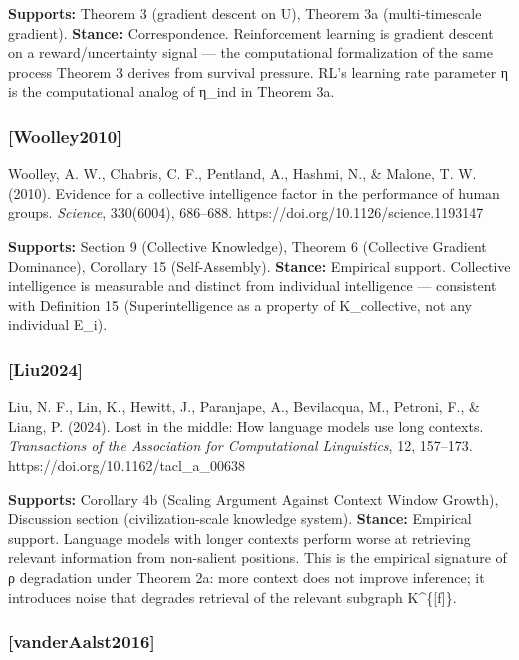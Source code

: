 \documentclass[
]{article}
\begin{document}
\textbf{Supports:} Theorem 3 (gradient descent on U), Theorem 3a
(multi-timescale gradient). \textbf{Stance:} Correspondence.
Reinforcement learning is gradient descent on a reward/uncertainty
signal --- the computational formalization of the same process Theorem 3
derives from survival pressure. RL's learning rate parameter η is the
computational analog of η\_ind in Theorem 3a.

\subsubsection{{[}Woolley2010{]}}\label{woolley2010}

Woolley, A. W., Chabris, C. F., Pentland, A., Hashmi, N., \& Malone, T.
W. (2010). Evidence for a collective intelligence factor in the
performance of human groups. \emph{Science}, 330(6004), 686--688.
https://doi.org/10.1126/science.1193147

\textbf{Supports:} Section 9 (Collective Knowledge), Theorem 6
(Collective Gradient Dominance), Corollary 15 (Self-Assembly).
\textbf{Stance:} Empirical support. Collective intelligence is
measurable and distinct from individual intelligence --- consistent with
Definition 15 (Superintelligence as a property of K\_collective, not any
individual E\_i).

\subsubsection{{[}Liu2024{]}}\label{liu2024}

Liu, N. F., Lin, K., Hewitt, J., Paranjape, A., Bevilacqua, M., Petroni,
F., \& Liang, P. (2024). Lost in the middle: How language models use
long contexts. \emph{Transactions of the Association for Computational
Linguistics}, 12, 157--173. https://doi.org/10.1162/tacl\_a\_00638

\textbf{Supports:} Corollary 4b (Scaling Argument Against Context Window
Growth), Discussion section (civilization-scale knowledge system).
\textbf{Stance:} Empirical support. Language models with longer contexts
perform worse at retrieving relevant information from non-salient
positions. This is the empirical signature of ρ degradation under
Theorem 2a: more context does not improve inference; it introduces noise
that degrades retrieval of the relevant subgraph K\^{}\{{[}f{]}\}.

\subsubsection{{[}vanderAalst2016{]}}\label{vanderaalst2016}
\end{document}
